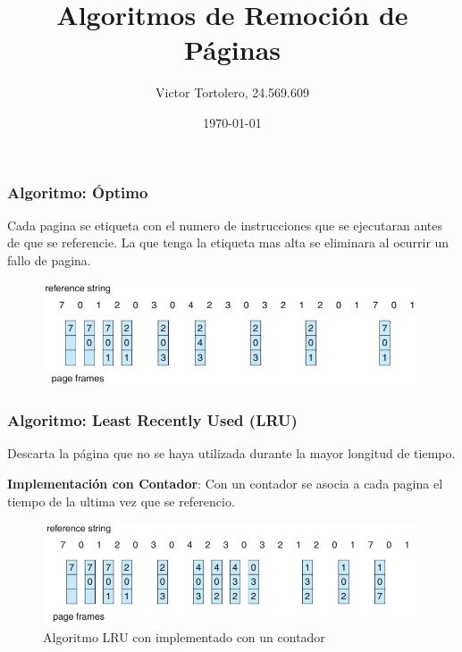 \documentclass{beamer}
\title{Algoritmos de Remoción de Páginas}
\author{Victor Tortolero, 24.569.609}
\institute{
	Sistemas Operativos, FACYT
}
\date{\today}
\newcommand{\algTitle}{\textbf{Algoritmo:} }
\begin{document}

\begin{frame}
	\titlepage

\end{frame}
\author{}


\begin{frame}
\frametitle{\algTitle Óptimo}

{ \footnotesize
Cada pagina se etiqueta con el numero de instrucciones que se ejecutaran antes de que se referencie. 
La que tenga la etiqueta mas alta se eliminara al ocurrir un fallo de pagina. }

\begin{figure}
	\centering
	\includegraphics[scale=0.5]{img/optimo.png}
\end{figure}

\end{frame}

\begin{frame}
	\frametitle{\algTitle Least Recently Used (LRU)}
	{\scriptsize Descarta la página que no se haya utilizada durante la mayor longitud de tiempo.}
	
	{\footnotesize \textbf{Implementación con Contador}: Con un contador se asocia a cada pagina el tiempo de la ultima vez que se referencio.}
	
	\begin{figure}[H]
		\centering
		\includegraphics[scale=0.5]{img/lru1.png}
		\caption{Algoritmo LRU con implementado con un contador}
	\end{figure}


\end{frame}
\end{document}
